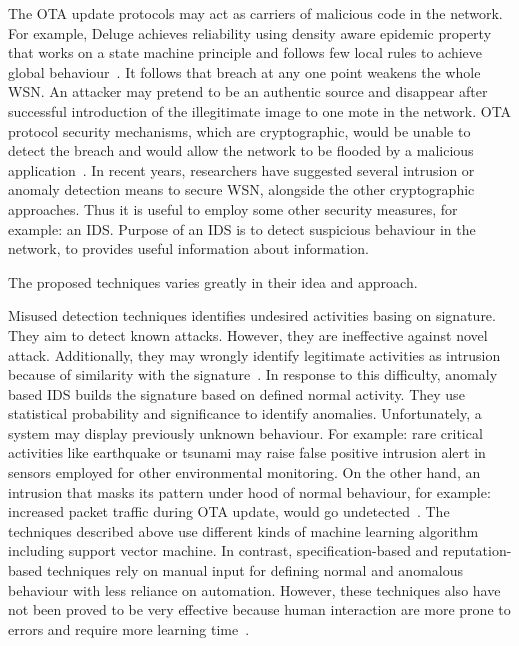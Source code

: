 \documentclass[conference,manuscript]{IEEEtran}
\begin{document}
The OTA update protocols may act as carriers of malicious
code in the network. For example, Deluge achieves reliability
using density aware epidemic property that works on a state
machine principle and follows few local rules to achieve global
behaviour~\cite{1031506}.
It follows that breach at any one point weakens
the whole WSN. An attacker may pretend to be an authentic
source and disappear after successful introduction of the illegitimate image to one mote in the network. OTA protocol security
mechanisms, which are cryptographic, would be unable to
detect the breach and would allow the network to be flooded
by a malicious application~\cite{Karlof:2004:TLL:1031495.1031515}.
In recent years, researchers
have suggested several intrusion or anomaly detection means
to secure WSN, alongside the other cryptographic approaches.
Thus it is useful to employ some other security measures, for
example: an IDS. Purpose of an IDS is to detect suspicious
behaviour in the network, to provides useful information about
information.

The proposed techniques varies greatly in their idea and approach.

Misused  detection  techniques identifies undesired activities basing on signature.
They aim to detect known attacks.
However, they are ineffective against novel attack.
Additionally, they may wrongly identify legitimate activities as intrusion because of similarity with the signature~\cite{372146, 1515559, ISI:000298891500099, Chen:2009:NMI:1516241.1516282, 1424814, Strikos_afull}.
In response to this difficulty, anomaly based IDS builds the signature based on defined normal activity.
They use statistical probability and significance to identify anomalies. Unfortunately, a system may display previously unknown behaviour.
For example: rare critical activities like earthquake or tsunami may raise false positive intrusion alert in sensors employed for other environmental monitoring.
On the other hand, an intrusion that masks its pattern under hood of normal behaviour, for example: increased packet traffic during OTA update, would go undetected~\cite{ISI:000257882502160, 1593102, 1593102, 1290173, 4024996}.
The techniques described above use different kinds of machine learning algorithm including support vector machine.
In contrast, specification-based and reputation-based techniques rely on manual input for defining normal and anomalous behaviour with less reliance on automation.
However, these techniques also have not been proved to be very effective because human interaction are more prone to errors and require more learning time~\cite{Chen:2009:NMI:1516241.1516282, 4085803, Ko2001}. 
\end{document}
